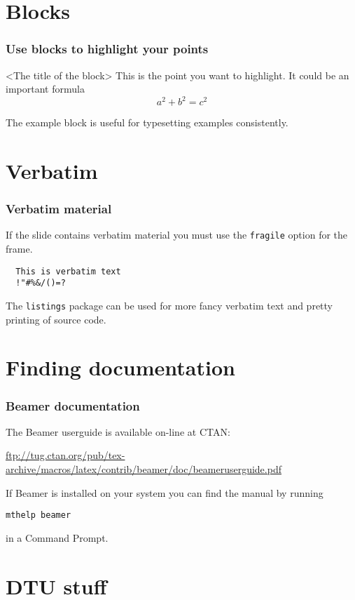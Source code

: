 \documentclass[presentation]{beamer}   %
\begin{document}
\section{Blocks}
\begin{frame}
  \frametitle{Use blocks to highlight your points}
  \begin{block}{<The title of the block>}
    This is the point you want to highlight. It could be an important formula
    \[
      a^2+b^2=c^2
    \]
  \end{block}

  \begin{example}
    The example block is useful for typesetting examples consistently.
  \end{example}
\end{frame}

\section{Verbatim}
\begin{frame}[fragile]
  \frametitle{Verbatim material}
  If the slide contains verbatim material you must use the \texttt{fragile} option for the frame.

  \begin{verbatim}
  This is verbatim text
  !"#%&/()=?
  \end{verbatim}
  
  The \texttt{listings} package can be used for more fancy verbatim text and pretty printing of source code.
\end{frame}

\section{Finding documentation}
\begin{frame}
  \frametitle{Beamer documentation}
  The Beamer userguide is available on-line at CTAN:
  \begin{center}
    \url{ftp://tug.ctan.org/pub/tex-archive/macros/latex/contrib/beamer/doc/beameruserguide.pdf}
  \end{center}

  If Beamer is installed on your system you can find the manual by running
  \begin{center}
    \texttt{mthelp beamer}
  \end{center}
  in a Command Prompt.
\end{frame}

\section{DTU stuff}
\end{document}
